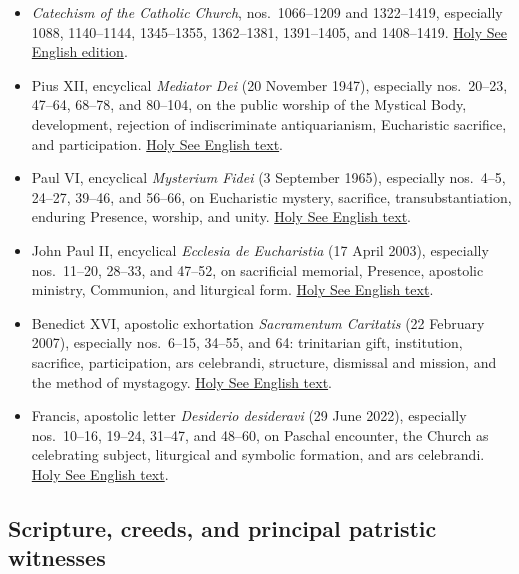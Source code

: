 \begin{itemize}
  \item \emph{Catechism of the Catholic Church}, nos.~1066--1209 and 1322--1419, especially 1088, 1140--1144, 1345--1355, 1362--1381, 1391--1405, and 1408--1419. \href{https://www.vatican.va/archive/ENG0015/_INDEX.HTM}{Holy See English edition}.
  \item Pius XII, encyclical \emph{Mediator Dei} (20 November 1947), especially nos.~20--23, 47--64, 68--78, and 80--104, on the public worship of the Mystical Body, development, rejection of indiscriminate antiquarianism, Eucharistic sacrifice, and participation. \href{https://www.vatican.va/content/pius-xii/en/encyclicals/documents/hf_p-xii_enc_20111947_mediator-dei.html}{Holy See English text}.
  \item Paul VI, encyclical \emph{Mysterium Fidei} (3 September 1965), especially nos.~4--5, 24--27, 39--46, and 56--66, on Eucharistic mystery, sacrifice, transubstantiation, enduring Presence, worship, and unity. \href{https://www.vatican.va/content/paul-vi/en/encyclicals/documents/hf_p-vi_enc_03091965_mysterium.html}{Holy See English text}.
  \item John Paul II, encyclical \emph{Ecclesia de Eucharistia} (17 April 2003), especially nos.~11--20, 28--33, and 47--52, on sacrificial memorial, Presence, apostolic ministry, Communion, and liturgical form. \href{https://www.vatican.va/content/john-paul-ii/en/encyclicals/documents/hf_jp-ii_enc_20030417_eccl-de-euch.html}{Holy See English text}.
  \item Benedict XVI, apostolic exhortation \emph{Sacramentum Caritatis} (22 February 2007), especially nos.~6--15, 34--55, and 64: trinitarian gift, institution, sacrifice, participation, ars celebrandi, structure, dismissal and mission, and the method of mystagogy. \href{https://www.vatican.va/content/benedict-xvi/en/apost_exhortations/documents/hf_ben-xvi_exh_20070222_sacramentum-caritatis.html}{Holy See English text}.
  \item Francis, apostolic letter \emph{Desiderio desideravi} (29 June 2022), especially nos.~10--16, 19--24, 31--47, and 48--60, on Paschal encounter, the Church as celebrating subject, liturgical and symbolic formation, and ars celebrandi. \href{https://www.vatican.va/content/francesco/en/apost_letters/documents/20220629-lettera-ap-desiderio-desideravi.html}{Holy See English text}.
\end{itemize}

\subsection{Scripture, creeds, and principal patristic witnesses}

